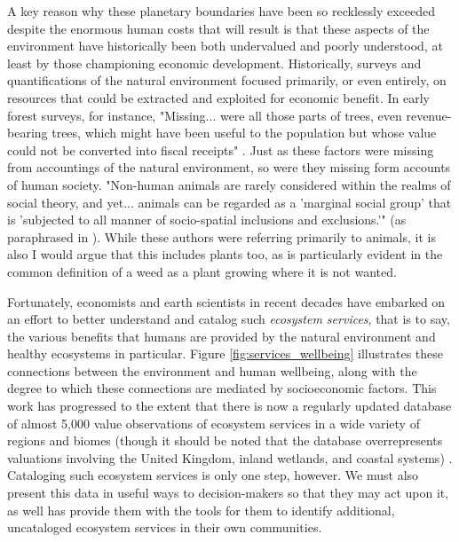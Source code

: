 A key reason why these planetary boundaries have been so recklessly exceeded despite the enormous human costs that will result is that these aspects of the environment have historically been both undervalued and poorly understood, at least by those championing economic development. Historically, surveys and quantifications of the natural environment focused primarily, or even entirely, on resources that could be extracted and exploited for economic benefit. In early forest surveys, for instance, "Missing... were all those parts of trees, even revenue-bearing trees, which might have been useful to the population but whose value could not be converted into fiscal receipts" \cite{scottSeeingStateHow2020}. Just as these factors were missing from accountings of the natural environment, so were they missing form accounts of human society. "Non-human animals are rarely considered within the realms of social theory, and yet... animals can be regarded as a 'marginal social group' that is 'subjected to all manner of socio-spatial inclusions and exclusions.'" (\cite{philolAnimalsGeographyCity1995,westcoatBringingAnimalsBack1995,wolchAnimalGeographiesPlace1998}as paraphrased in \cite{harrisRethinkingMapsMorethanhuman2011}). While these authors were referring primarily to animals, it is also  I would argue that this includes plants too, as is particularly evident in the common definition of a weed as a plant growing where it is not wanted.

Fortunately, economists and earth scientists in recent decades have embarked on an effort to better understand and catalog such \textit{ecosystem services}, that is to say, the various benefits that humans are provided by the natural environment and healthy ecosystems in particular. Figure \ref{fig:services_wellbeing} illustrates these connections between the environment and human wellbeing, along with the degree to which these connections are mediated by socioeconomic factors. This work has progressed to the extent that there is now a regularly updated database of almost 5,000 value observations of ecosystem services in a wide variety of regions and biomes (though it should be noted that the database overrepresents valuations involving the United Kingdom, inland wetlands, and coastal systems) \cite{grootEcosystemServicesValuation2020}. Cataloging such ecosystem services is only one step, however. We must also present this data in useful ways to decision-makers  so that they may act upon it, as well has provide them with the tools for them to identify additional, uncataloged ecosystem services in their own communities.

